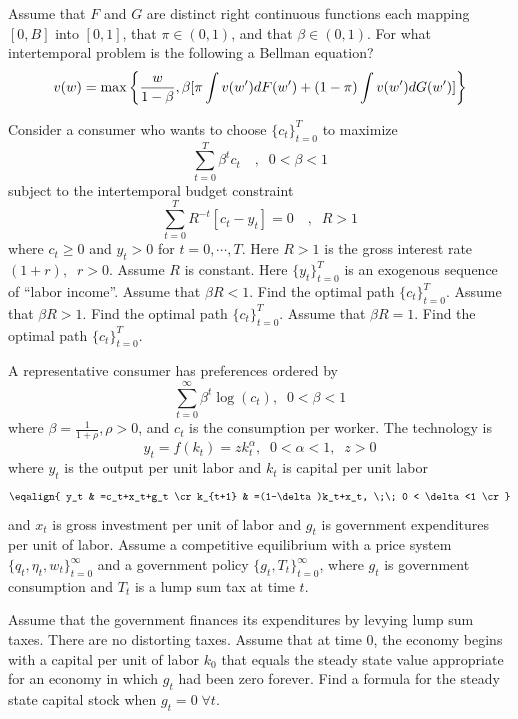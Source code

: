 \medskip



  Assume that  $F$ and $G$ are distinct  right continuous functions each mapping $[0, B]$ into $[0,1]$, that $\pi \in (0,1)$, and  that $\beta \in (0,1)$. For what intertemporal problem is the following a Bellman equation?
$$ v(w) = \max\left\{ {w\over{1-\beta}},  \beta [  \pi \int v(w') d F(w') + (1-\pi) \int v(w') d G(w') ]  \right\} $$




\bye



\medskip
{}
\medskip \noindent  Consider a consumer who wants to choose $\{c_t\}_{t=0}^T$ to maximize
$$\sum_{t=0}^T \beta^tc_t  \quad  , \;\;  0< \beta<1$$ subject to the intertemporal budget constraint
$$\sum_{t=0}^T R^{-t}[c_t-y_t]=0  \quad  , \;\;  R>1$$ where $c_t\geq0$ and $y_t>0$ for $t=0,\cdots,T$. Here $R>1$ is the gross interest rate $(1+r),\;\; r>0$. Assume $R$ is constant. Here $\{y_t\}_{t=0}^T $ is an exogenous sequence of ``labor income''.
\medskip
{} Assume that $\beta R < 1$. Find the optimal path $\{c_t\}_{t=0}^T$.
\medskip
{} Assume that $\beta R > 1$. Find the optimal path $\{c_t\}_{t=0}^T$.
\medskip
{} Assume that $\beta R = 1$. Find the optimal path $\{c_t\}_{t=0}^T$.

\medskip
{}
\medskip
\noindent
 A representative consumer has preferences ordered by
 $$ \sum_{t=0}^\infty \beta^t \log(c_t), \;\;  0< \beta<1$$
 where $\beta = {\frac{1}{1+\rho}}, \rho>0$, and $c_t$ is the consumption per worker.
The technology is $$ y_t=f(k_t)=zk_t^\alpha, \;\; 0<\alpha<1, \;\; z>0 $$
where $y_t$ is the output per unit labor and $k_t$ is capital per unit labor
$$\eqalign{
y_t & =c_t+x_t+g_t \cr
  k_{t+1} & =(1-\delta)k_t+x_t, \;\;  0 < \delta<1 \cr
}$$
and $x_t$ is  gross investment per unit of labor and $g_t$ is  government expenditures per unit of labor.
Assume a competitive equilibrium with a price system $\{q_t,\eta_t,w_t\}_{t=0}^\infty$ and a government policy $\{g_t,T_t\}_{t=0}^\infty$, where
$g_t$ is government consumption and $T_t$ is a lump sum tax at time $t$.

 Assume that the government finances its expenditures by levying lump sum taxes. There are no distorting taxes. Assume that at time 0, the economy begins
 with a capital per unit of labor $k_0$ that equals the steady state value appropriate for an economy in which $g_t$ had been zero forever.
\medskip
{} Find a formula for the steady state capital stock when $g_t=0 \; \forall t$.
\medskip

